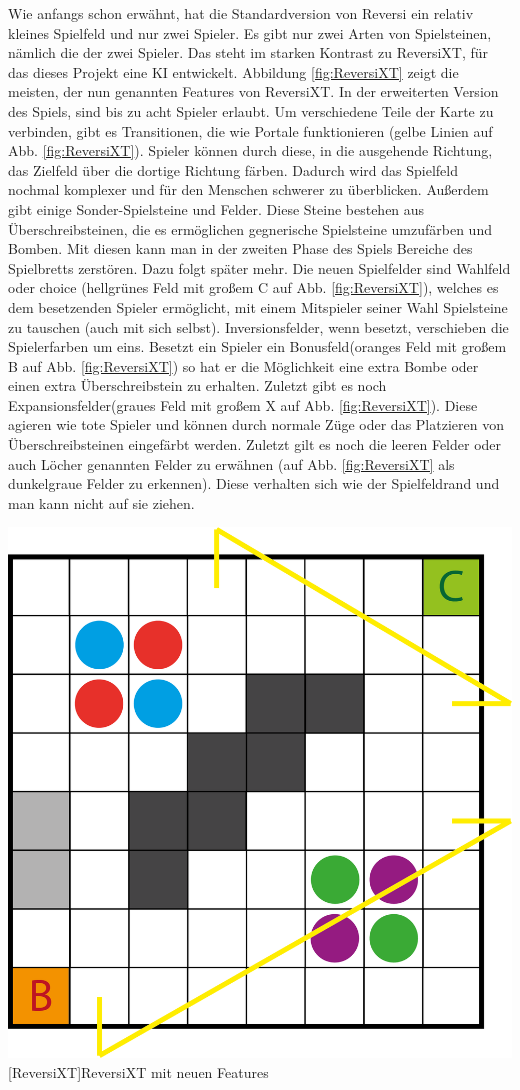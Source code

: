 \documentclass[12pt,a4paper,bibliography=totocnumbered,listof=totocnumbered]{scrartcl}
\begin{document}
    Wie anfangs schon erwähnt, hat die Standardversion von Reversi ein relativ kleines Spielfeld und nur zwei Spieler. Es gibt nur zwei Arten von Spielsteinen, nämlich die der zwei Spieler. Das steht im starken Kontrast zu ReversiXT, für das dieses Projekt eine KI entwickelt. Abbildung \ref{fig:ReversiXT} zeigt die meisten, der nun genannten Features von ReversiXT. In der erweiterten Version des Spiels, sind bis zu acht Spieler erlaubt. Um verschiedene Teile der Karte zu verbinden, gibt es Transitionen, die wie \glqq Portale \grqq{} funktionieren (gelbe Linien auf Abb. \ref{fig:ReversiXT}). Spieler können durch diese, in die ausgehende Richtung, das Zielfeld über die dortige Richtung färben. Dadurch wird das Spielfeld nochmal komplexer und für den Menschen schwerer zu überblicken.  Außerdem gibt einige Sonder-Spielsteine und Felder. Diese Steine bestehen aus \glqq Überschreibsteinen\grqq, die es ermöglichen gegnerische Spielsteine umzufärben und \glqq Bomben\grqq. Mit diesen kann man in der zweiten Phase des Spiels Bereiche des Spielbretts zerstören. Dazu folgt später mehr. Die neuen Spielfelder sind \glqq Wahlfeld\grqq{} oder \glqq choice \grqq{} (hellgrünes Feld mit großem C auf Abb. \ref{fig:ReversiXT}), welches es dem besetzenden Spieler ermöglicht, mit einem Mitspieler seiner Wahl Spielsteine zu tauschen (auch mit sich selbst). \glqq Inversionsfelder\grqq, wenn besetzt, verschieben die Spielerfarben um eins. Besetzt ein Spieler ein \glqq Bonusfeld\grqq (oranges Feld mit großem B auf Abb. \ref{fig:ReversiXT}) so hat er die Möglichkeit eine extra Bombe oder einen extra Überschreibstein zu erhalten. Zuletzt gibt es noch \glqq Expansionsfelder\grqq (graues Feld mit großem X auf Abb. \ref{fig:ReversiXT}). Diese agieren wie \glqq tote\grqq{} Spieler und können durch normale Züge oder das Platzieren von Überschreibsteinen eingefärbt werden. Zuletzt gilt es noch die leeren Felder oder auch \glqq Löcher \grqq{} genannten Felder zu erwähnen (auf Abb. \ref{fig:ReversiXT} als dunkelgraue Felder zu erkennen). Diese verhalten sich wie der Spielfeldrand und man kann nicht auf sie ziehen.
    
    \vspace{1em}
    \begin{minipage}{\linewidth}
    	\centering
    	\includegraphics[width=0.45\linewidth]{pics/Kapitel_1/Kapitel_1_pic2.png}
    	[ReversiXT]{ReversiXT mit neuen Features}
    	\label{fig:ReversiXT}
    \end{minipage}
   	\vspace{1em}
\end{document}
